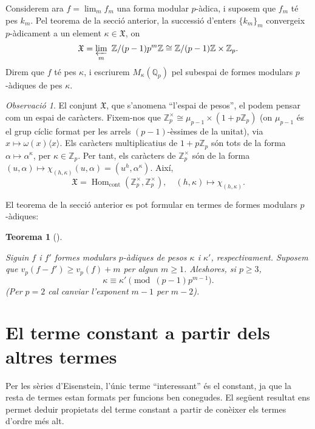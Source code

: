 \documentclass[
  letterpaper,
  DIV=11,
  numbers=noendperiod]{scrreprt}
\theoremstyle{plain}
\newtheorem{theorem}{Teorema}[chapter]
\theoremstyle{plain}
\theoremstyle{definition}
\theoremstyle{plain}
\theoremstyle{plain}
\theoremstyle{definition}
\theoremstyle{remark}
\newtheorem{refremark}{Observació}[chapter]
\begin{document}
Considerem ara \(f=\lim_m f_m\) una forma modular \(p\)-àdica, i suposem
que \(f_m\) té pes \(k_m\). Pel teorema de la secció anterior, la
successió d'enters \(\{k_m\}_m\) convergeix \(p\)-àdicament a un element
\(\kappa \in\mathfrak{X}\), on \[
\mathfrak{X}= \varprojlim_m\ \mathbb{Z}/(p-1)p^m\mathbb{Z}\cong \mathbb{Z}/(p-1)\mathbb{Z}\times \mathbb{Z}_p.
\] Direm que \(f\) té pes \(\kappa\), i escriurem
\(M_\kappa(\mathbb{Q}_p)\) pel subespai de formes modulars \(p\)-àdiques
de pes \(\kappa\).

\begin{refremark}
El conjunt \(\mathfrak{X}\), que s'anomena ``l'espai de pesos'', el
podem pensar com un espai de caràcters. Fixem-nos que
\(\mathbb{Z}_p^\times \cong \mu_{p-1} \times (1+p\mathbb{Z}_p)\) (on
\(\mu_{p-1}\) és el grup cíclic format per les arrels \((p-1)\)-èssimes
de la unitat), via \(x\mapsto \omega(x)\langle x\rangle\). Els caràcters
multiplicatius de \(1+p\mathbb{Z}_p\) són tots de la forma
\(\alpha\mapsto \alpha^{\kappa}\), per \(\kappa\in\mathbb{Z}_p\). Per
tant, els caràcters de \(\mathbb{Z}_p^\times\) són de la forma
\((u,\alpha)\mapsto \chi_{(h,\kappa)}(u,\alpha)=(u^h, \alpha^\kappa)\).
Així, \[
\mathfrak{X}= \operatorname{Hom}_{\text{cont}}(\mathbb{Z}_p^\times,\mathbb{Z}_p^\times), \quad (h,\kappa)\mapsto \chi_{(h,\kappa)}.
\]

\label{rem-}

\end{refremark}

El teorema de la secció anterior es pot formular en termes de formes
modulars \(p\)-àdiques:

\begin{theorem}[]\protect\hypertarget{thm-}{}\label{thm-}

Siguin \(f\) i \(f'\) formes modulars \(p\)-àdiques de pesos \(\kappa\)
i \(\kappa'\), respectivament. Suposem que \(v_p(f-f')\geq v_p(f)+m\)
per algun \(m\geq 1\). Aleshores, si \(p\geq 3\), \[
\kappa\equiv \kappa' \pmod{(p-1)p^{m-1}}.
\] (Per \(p=2\) cal canviar l'exponent \(m-1\) per \(m-2\)).

\end{theorem}

\section{El terme constant a partir dels altres
termes}\label{el-terme-constant-a-partir-dels-altres-termes}

Per les sèries d'Eisenstein, l'únic terme ``interessant'' és el
constant, ja que la resta de termes estan formats per funcions ben
conegudes. El següent resultat ens permet deduir propietats del terme
constant a partir de conèixer els termes d'ordre més alt.
\end{document}
